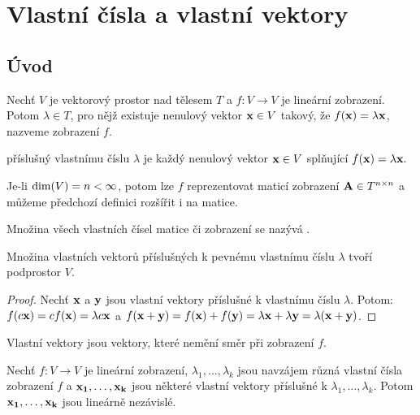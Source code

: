 \section{Vlastní čísla a vlastní vektory}

\subsection{Úvod}

\begin{definition}
    Nechť $V$ je vektorový prostor nad tělesem $T$ a $f: V \rightarrow V$
    je lineární zobrazení. Potom $\lambda \in T$, pro nějž existuje nenulový
    vektor $\mathbf{x} \in V$ takový, že $f(\mathbf{x}) = \lambda\mathbf{x}$, nazveme 
     zobrazení $f$.

     příslušný vlastnímu číslu $\lambda$ je každý
    nenulový vektor $\mathbf{x} \in V$ splňující $f(\mathbf{x}) = \lambda\mathbf{x}.$

    Je-li $\mathop{\mathrm{dim}}(V) = n < \infty$, potom lze $f$ reprezentovat maticí zobrazení
    $\mathbf{A} \in T^{n \times n}$ a můžeme předchozí definici rozšířit i na matice.
 
    Množina všech vlastních čísel matice či zobrazení se nazývá
    .
\end{definition}

\begin{observation}
    Množina vlastních vektorů příslušných k pevnému vlastnímu číslu $\lambda$
    tvoří podprostor $V$.
\end{observation}

\begin{proof}
    Nechť $\mathbf{x}$ a $\mathbf{y}$ jsou vlastní vektory příslušné k vlastnímu číslu 
    $\lambda$. Potom:
    $f(c\mathbf{x}) = cf(\mathbf{x}) = \lambda c \mathbf{x}$ a $f(\mathbf{x} + \mathbf{y}) = f(\mathbf{x}) + f(\mathbf{y}) = \lambda
    \mathbf{x} + \lambda \mathbf{y} = \lambda (\mathbf{x} + \mathbf{y})$.
\end{proof}

\begin{remark}
    Vlastní vektory jsou vektory, které nemění směr při zobrazení $f$.
\end{remark}

\begin{theorem}
    \label{th:indeigenvectors}
    Nechť $f: V \rightarrow V$ je lineární zobrazení, $\lambda_1, \dots, 
    \lambda_k$ jsou navzájem různá vlastní čísla zobrazení $f$ a $\mathbf{x_1},
    \dots, \mathbf{x_k}$ jsou některé vlastní vektory příslušné k $\lambda_1,
    \dots, \lambda_k$. Potom $\mathbf{x_1}, \dots, \mathbf{x_k}$ jsou lineárně nezávislé.
\end{theorem}

